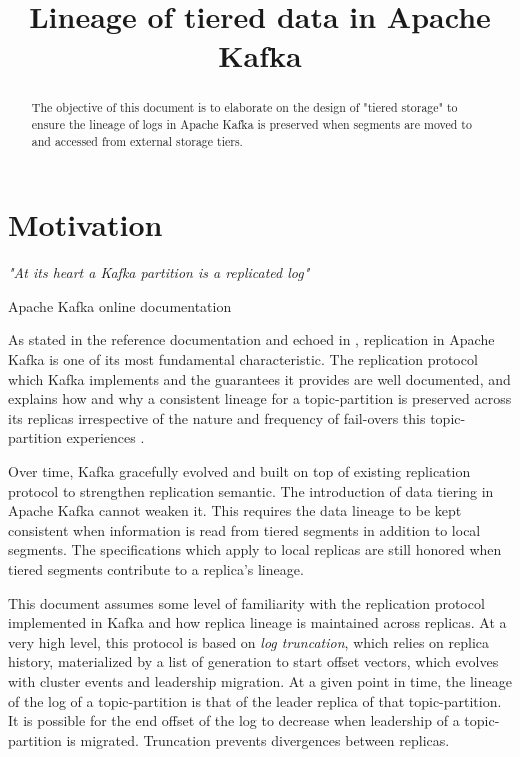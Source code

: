 \documentclass{article}
\title{Lineage of tiered data in Apache Kafka}
\begin{document}
\maketitle \thispagestyle{fancy2}
\begin{abstract}
	The objective of this document is to elaborate on the design of "tiered storage" to ensure the lineage of logs in Apache Kafka is preserved  when segments are moved to and accessed from external storage tiers.
\end{abstract}

\tableofcontents

\newpage
\section{Motivation}
\epigraph{\textit{"At its heart a Kafka partition is a replicated log"}}{Apache Kafka online documentation \cite{RD1}}

As stated in the reference documentation and echoed in \cite{KDG}, replication in Apache Kafka is one of its most fundamental characteristic. The replication protocol which Kafka implements and the guarantees it provides are well documented, and explains how and why a consistent lineage for a topic-partition is preserved across its replicas irrespective of the nature and frequency of fail-overs this topic-partition experiences \cite{KIP101}\cite{KIP279}.

Over time, Kafka gracefully evolved and built on top of existing replication protocol to strengthen replication semantic. The introduction of data tiering in Apache Kafka cannot weaken it. This requires the data lineage to be kept consistent when information is read from tiered segments in addition to local segments. The specifications which apply to local replicas are still honored when tiered segments contribute to a replica's lineage.

This document assumes some level of familiarity with the replication protocol implemented in Kafka and how replica lineage is maintained across replicas. At a very high level, this protocol is based on \textit{log truncation}, which relies on replica history, materialized by a list of generation to start offset vectors, which evolves with cluster events and leadership migration. At a given point in time, the lineage of the log of a topic-partition is that of the leader replica of that topic-partition. It is possible for the end offset of the log to decrease when leadership of a topic-partition is migrated. Truncation prevents divergences between replicas.
\end{document}
